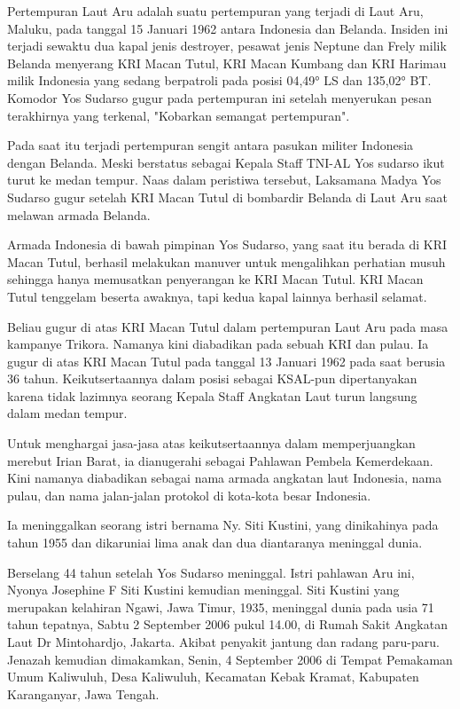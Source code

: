 Pertempuran Laut Aru adalah suatu pertempuran yang terjadi di Laut Aru, Maluku, pada tanggal 15 Januari 1962 antara Indonesia dan Belanda. Insiden ini terjadi sewaktu dua kapal jenis destroyer, pesawat jenis Neptune dan Frely milik Belanda menyerang KRI Macan Tutul, KRI Macan Kumbang dan KRI Harimau milik Indonesia yang sedang berpatroli pada posisi 04,49° LS dan 135,02° BT. Komodor Yos Sudarso gugur pada pertempuran ini setelah menyerukan pesan terakhirnya yang terkenal, "Kobarkan semangat pertempuran".

Pada saat itu terjadi pertempuran sengit antara pasukan militer Indonesia  dengan Belanda. Meski berstatus sebagai Kepala Staff TNI-AL Yos sudarso ikut  turut ke medan tempur. Naas dalam peristiwa tersebut, Laksamana Madya Yos  Sudarso gugur setelah KRI Macan Tutul di bombardir Belanda di Laut Aru saat  melawan armada Belanda.

Armada Indonesia di bawah pimpinan Yos Sudarso, yang saat itu berada di KRI Macan Tutul, berhasil melakukan manuver untuk mengalihkan perhatian musuh sehingga hanya memusatkan penyerangan ke KRI Macan Tutul. KRI Macan Tutul tenggelam beserta awaknya, tapi kedua kapal lainnya berhasil selamat.

Beliau gugur di atas KRI Macan Tutul dalam pertempuran Laut Aru pada masa kampanye Trikora. Namanya kini diabadikan pada sebuah KRI dan pulau. Ia gugur di atas KRI Macan Tutul pada tanggal 13 Januari  1962 pada saat berusia 36 tahun. Keikutsertaannya dalam posisi sebagai KSAL-pun  dipertanyakan karena tidak lazimnya seorang Kepala Staff Angkatan Laut turun  langsung dalam medan tempur.

Untuk menghargai jasa-jasa atas keikutsertaannya dalam memperjuangkan merebut Irian  Barat, ia dianugerahi sebagai Pahlawan Pembela Kemerdekaan. Kini namanya  diabadikan sebagai nama armada angkatan laut Indonesia, nama pulau, dan nama  jalan-jalan protokol di kota-kota besar Indonesia.

Ia meninggalkan seorang istri bernama Ny. Siti Kustini, yang dinikahinya pada  tahun 1955 dan dikaruniai lima anak dan dua diantaranya meninggal dunia.

Berselang 44 tahun setelah Yos Sudarso meninggal. Istri pahlawan Aru ini, Nyonya Josephine F Siti Kustini kemudian meninggal. Siti Kustini yang merupakan kelahiran Ngawi, Jawa  Timur, 1935, meninggal dunia pada usia 71 tahun tepatnya, Sabtu 2 September  2006 pukul 14.00, di Rumah Sakit Angkatan Laut Dr Mintohardjo, Jakarta. Akibat penyakit jantung dan radang paru-paru. Jenazah  kemudian dimakamkan, Senin, 4 September 2006 di Tempat Pemakaman Umum Kaliwuluh,  Desa Kaliwuluh, Kecamatan Kebak Kramat, Kabupaten Karanganyar, Jawa Tengah.

